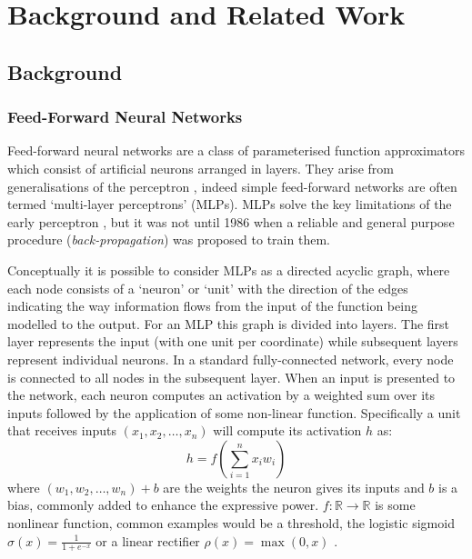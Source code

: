 
\chapter{Background and Related Work}\label{C:bg}
\section{Background}
\subsection{Feed-Forward Neural Networks}
Feed-forward neural networks are a class of parameterised function approximators which consist of
artificial neurons arranged in layers. They arise from generalisations of the perceptron
\autocite{Rosenblatt1958},
indeed simple feed-forward networks are often termed `multi-layer perceptrons' (MLPs). MLPs solve
the key limitations of the early perceptron \autocite{Minsky1969}, but it was not until 1986
when a reliable and general purpose procedure (\emph{back-propagation}) was 
proposed \autocite{Rumelhart1986} to train them.

Conceptually it is possible to consider MLPs as a directed acyclic graph, where each node consists
of a `neuron' or `unit' with the direction of the edges indicating the way information flows from
the input of the function being modelled to the output. For an MLP this graph is divided into layers.
The first layer represents the input (with one unit per coordinate) while subsequent layers
represent individual neurons. In a standard fully-connected network, every node is connected to all
nodes in the subsequent layer. When an input is presented to the network, each neuron computes
an activation by a weighted sum over its inputs followed by the application of some non-linear
function. Specifically a unit that receives inputs \((x_1, x_2, \ldots, x_n)\) will compute its
activation \(h\) as:
\begin{equation}\label{eq:perceptron}
	h = f\left(\sum_{i=1}^n x_iw_i\right)
\end{equation} where \((w_1, w_2, \ldots, w_n) + b\) are the weights the neuron gives its inputs and
\(b\) is a bias, commonly added to enhance the expressive power.
\(f : \mathbb{R} \to \mathbb{R}\) is some nonlinear function, common examples would be a threshold,
the logistic sigmoid \(\sigma(x) = \frac{1}{1 + e^{-x}}\) or a linear rectifier
\(\rho(x) = \max(0, x)\) \autocite{Nair}.

